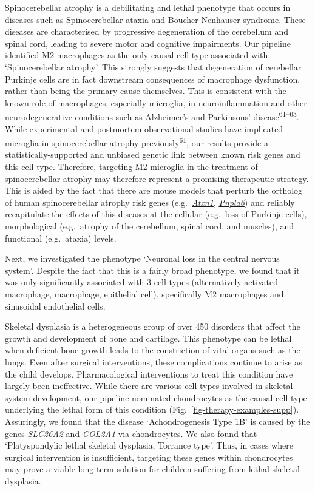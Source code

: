 \documentclass[
]{article}
\begin{document}
Spinocerebellar atrophy is a debilitating and lethal phenotype that
occurs in diseases such as Spinocerebellar ataxia and Boucher-Nenhauser
syndrome. These diseases are characterised by progressive degeneration
of the cerebellum and spinal cord, leading to severe motor and cognitive
impairments. Our pipeline identified M2 macrophages as the only causal
cell type associated with `Spinocerebellar atrophy'. This strongly
suggests that degeneration of cerebellar Purkinje cells are in fact
downstream consequences of macrophage dysfunction, rather than being the
primary cause themselves. This is consistent with the known role of
macrophages, especially microglia, in neuroinflammation and other
neurodegenerative conditions such as Alzheimer's and Parkinsons'
disease\textsuperscript{61--63}. While experimental and postmortem
observational studies have implicated microglia in spinocerebellar
atrophy previously\textsuperscript{61}, our results provide a
statistically-supported and unbiased genetic link between known risk
genes and this cell type. Therefore, targeting M2 microglia in the
treatment of spinocerebellar atrophy may therefore represent a promising
therapeutic strategy. This is aided by the fact that there are mouse
models that perturb the ortholog of human spinocerebellar atrophy risk
genes
(e.g.~\href{https://www.informatics.jax.org/marker/MGI:104783}{\emph{Atxn1}},
\href{https://www.informatics.jax.org/marker/MGI:1354723}{\emph{Pnpla6}})
and reliably recapitulate the effects of this diseases at the cellular
(e.g.~loss of Purkinje cells), morphological (e.g.~atrophy of the
cerebellum, spinal cord, and muscles), and functional (e.g.~ataxia)
levels.

Next, we investigated the phenotype `Neuronal loss in the central
nervous system'. Despite the fact that this is a fairly broad phenotype,
we found that it was only significantly associated with 3 cell types
(alternatively activated macrophage, macrophage, epithelial cell),
specifically M2 macrophages and sinusoidal endothelial cells.

Skeletal dysplasia is a heterogeneous group of over 450 disorders that
affect the growth and development of bone and cartilage. This phenotype
can be lethal when deficient bone growth leads to the constriction of
vital organs such as the lungs. Even after surgical interventions, these
complications continue to arise as the child develops. Pharmacological
interventions to treat this condition have largely been ineffective.
While there are various cell types involved in skeletal system
development, our pipeline nominated chondrocytes as the causal cell type
underlying the lethal form of this condition
(Fig.~\ref{fig-therapy-examples-supp}). Assuringly, we found that the
disease `Achondrogenesis Type 1B' is caused by the genes \emph{SLC26A2}
and \emph{COL2A1} via chondrocytes. We also found that `Platyspondylic
lethal skeletal dysplasia, Torrance type'. Thus, in cases where surgical
intervention is insufficient, targeting these genes within chondrocytes
may prove a viable long-term solution for children suffering from lethal
skeletal dysplasia.
\end{document}
